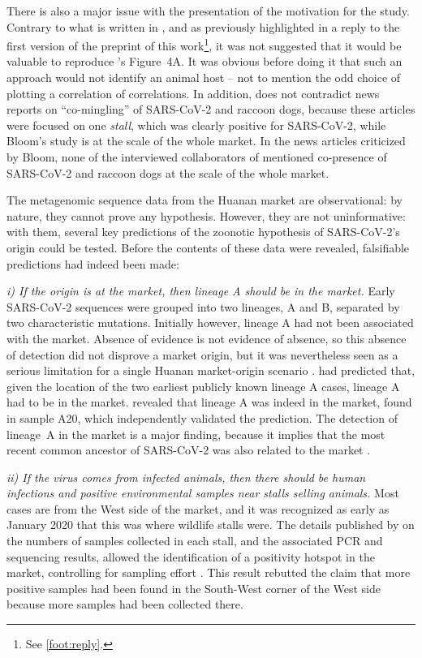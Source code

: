 \documentclass[11pt]{article}
\def \sct {\mbox{SARS-CoV-2}}
\begin{document}
There is also a major issue with the presentation of the motivation for the study. Contrary to what is written in \citet{Bloom2023VE}, and as previously highlighted in a reply to the first version of the preprint of this work\footnote{See \cref{foot:reply}.}, it was not suggested that it would be valuable to reproduce \citet{Liu2022RS}'s Figure~4A. It was obvious before doing it \citep{ACC2023Zenodo} that such an approach would not identify an animal host -- not to mention the odd choice of plotting a correlation of correlations. In addition, \citet{Bloom2023VE} does not contradict news reports on ``co-mingling'' of SARS-CoV-2 and raccoon dogs, because these articles were focused on one \textit{stall}, which was clearly positive for \sct{}, while Bloom's study is at the scale of the whole market. In the news articles criticized by Bloom, none of the interviewed collaborators of \citet{ACC2023Zenodo} mentioned co-presence of \sct{} and raccoon dogs at the scale of the whole market. 
 
The metagenomic sequence data from the Huanan market are observational: by nature, they cannot prove any hypothesis. However, they are not uninformative: with them, several key predictions of the zoonotic hypothesis of \sct{}'s origin could be tested. Before the contents of these data were revealed, falsifiable predictions had indeed been made: 

\textit{i) If the origin is at the market, then lineage A should be in the market.}
Early SARS-CoV-2 sequences were grouped into two lineages, A and B, separated by two characteristic mutations. Initially however, lineage A had not been associated with the market. Absence of evidence is not evidence of absence, so this absence of detection did not disprove a market origin, but it was nevertheless seen as a serious limitation for a single Huanan market-origin scenario \citep{Zhang2020Nature, Bloom2021MBE}.  had predicted that, given the location of the two earliest publicly known lineage A cases, lineage A had to be in the market.  revealed that lineage A was indeed in the market, found in sample A20, which independently validated the prediction. The detection of lineage~A in the market is a major finding, because it implies that the most recent common ancestor of \sct{} was also related to the market \citep{Babar2022Zenodo}. 

\textit{ii) If the virus comes from infected animals, then there should be human infections and positive environmental samples near stalls selling animals.} 
Most cases are from the West side of the market, and it was recognized as early as January 2020 that this was where wildlife stalls were. The details published by \citet{Liu2023Nature} on the numbers of samples collected in each stall, and the associated PCR and sequencing results, allowed the identification of a positivity hotspot in the market, controlling for sampling effort \citep{ACC2023bioRxiv}. This result rebutted the claim that more positive samples had been found in the South-West corner of the West side because more samples had been collected there.
\end{document}
